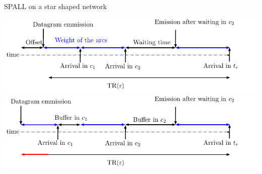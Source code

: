 \documentclass[10 pt]{beamer}
\begin{document}
\begin{frame}{SPALL on a star shaped network}

 \begin{overprint}

\includegraphics[width=\textwidth]{time.pdf}
\includegraphics[width=\textwidth]{time2.pdf}

\end{overprint}

\end{frame}
\end{document}
